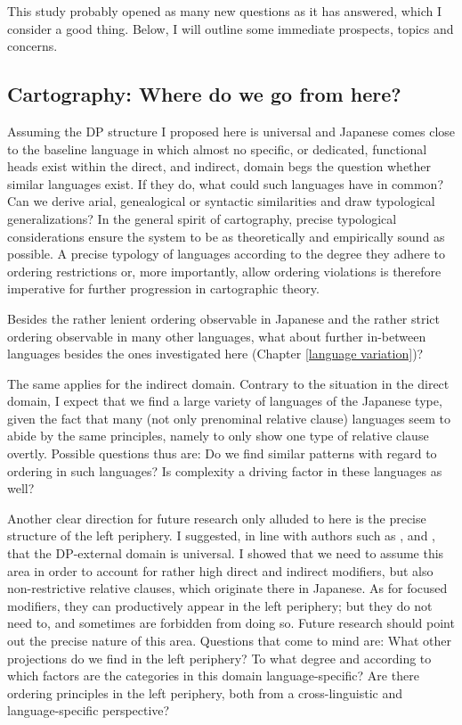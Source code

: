 \documentclass [output=book,colorlinks,citecolor=brown]{langscibook}
\begin{document}
This study probably opened as many new questions as it has answered, which I consider a good thing. Below, I will outline some immediate prospects, topics and concerns.

\subsection{Cartography: Where do we go from here?}

Assuming the DP structure I proposed here is universal and Japanese comes close to the baseline language in which almost no specific, or dedicated, functional heads exist within the direct, and indirect, domain begs the question whether similar languages exist. If they do, what could such languages have in common? Can we derive arial, genealogical or syntactic similarities and draw typological generalizations? In the general spirit of cartography, precise typological considerations ensure the system to be as theoretically and empirically sound as possible. A precise typology of languages according to the degree they adhere to ordering restrictions or, more importantly, allow ordering violations is therefore imperative for further progression in cartographic theory.

Besides the rather lenient ordering observable in Japanese and the rather strict ordering observable in many other languages, what about further in-between languages besides the ones investigated here (Chapter \ref{language variation})?

The same applies for the indirect domain. Contrary to the situation in the direct domain, I expect that we find a large variety of languages of the Japanese type, given the fact that many (not only prenominal relative clause) languages seem to abide by the same principles, namely to only show one type of relative clause overtly. Possible questions thus are: Do we find similar patterns with regard to ordering in such languages? Is complexity a driving factor in these languages as well?

Another clear direction for future research only alluded to here is the precise structure of the left periphery. I suggested, in line with authors such as \citet{grohmann:2003:prolific}, \citet{laenzlinger:2005:french, laenzlinger:2011:elements} and \citet{kim:2019:syntax}, that the DP-external domain is universal. I showed that we need to assume this area in order to account for rather high direct and indirect modifiers, but also non-restrictive relative clauses, which originate there in Japanese. As for focused modifiers, they can productively appear in the left periphery; but they do not need to, and sometimes are forbidden from doing so. Future research should point out the precise nature of this area. Questions that come to mind are: What other projections do we find in the left periphery? To what degree and according to which factors are the categories in this domain language-specific? Are there ordering principles in the left periphery, both from a cross-linguistic and language-specific perspective?
\end{document}
